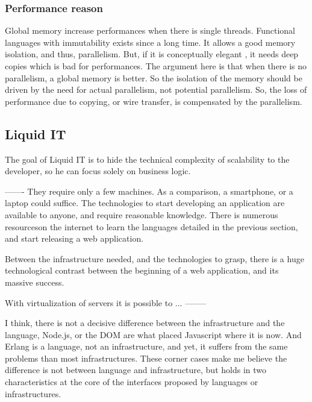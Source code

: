 \subsubsection{Performance reason}
Global memory increase performances when there is single threads.
Functional languages with immutability exists since a long time.
It allows a good memory isolation, and thus, parallelism.
But, if it is conceptually elegant , it needs deep copies which is bad for performances.
The argument here is that when there is no parallelism, a global memory is better.
So the isolation of the memory should be driven by the need for actual parallelism, not potential parallelism.
So, the loss of performance due to copying, or wire transfer, is compensated by the parallelism.












\subsection{Liquid IT}

The goal of Liquid IT is to hide the technical complexity of scalability to the developer, so he can focus solely on business logic.




-------
They require only a few machines.
As a comparison, a smartphone, or a laptop could suffice.
The technologies to start developing an application are available to anyone, and require reasonable knowledge.
There is numerous resourceson the internet to learn the languages detailed in the previous section, and start releasing a web application.

Between the infrastructure needed, and the technologies to grasp, there is a huge technological contrast between the beginning of a web application, and its massive success.

With virtualization of servers it is possible to ...
--------










I think, there is not a decisive difference between the infrastructure and the language, Node.js, or the DOM are what placed Javascript where it is now.
And Erlang is a language, not an infrastructure, and yet, it suffers from the same problems than most infrastructures.
These corner cases make me believe the difference is not between language and infrastructure, but holds in two characteristics at the core of the interfaces proposed by languages or infrastructures.

